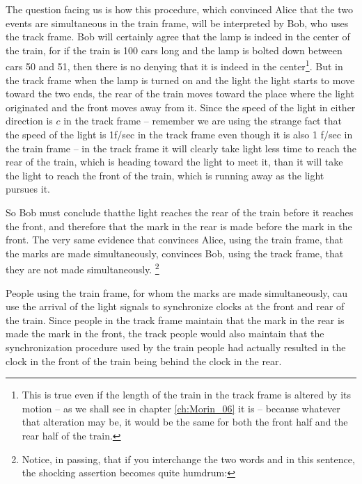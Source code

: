 The question facing us is how this procedure, which convinced Alice that the two events are simultaneous in the train frame, will be interpreted by Bob, who uses the track frame. Bob will certainly agree that the lamp is indeed in the center of the train, for if the train is 100 cars long and the lamp is bolted down between cars 50 and 51, then there is no denying that it is indeed in the center\footnote{This is true even if the length of the train in the track frame is altered by its motion -- as we shall see in chapter \ref{ch:Morin_06} it is -- because whatever that alteration may be, it would be the same for both the front half and the rear half of the train.}. But in the track frame when the lamp is turned on and the light the light starts to move toward the two ends, the rear of the train moves toward the place where the light originated and the front moves away from it. Since the speed of the light in either direction is $c$ in the track frame -- remember we are using the strange fact that the speed of the light is 1f/sec in the track frame even though it is also 1 f/sec in the train frame -- in the track frame it will clearly take light less time to reach the rear of the train, which is heading toward the light to meet it, than it will take the light to reach the front of the train, which is running away as the light pursues it.

So Bob must conclude thatthe light reaches the rear of the train before it reaches the front, and therefore that the mark in the rear is made before the mark in the front. The very same evidence that convinces Alice, using the train frame, that the marks are made simultaneously, convinces Bob, using the track frame, that they are not made simultaneously.  \footnote{Notice, in passing, that if you interchange the two words  and  in this sentence, the shocking assertion becomes quite humdrum: }

People using the train frame, for whom the marks are made simultaneously, cau use the arrival of the light signals to synchronize clocks at the front and rear of the train. Since people in the track frame maintain that the mark in the rear is made  the mark in the front, the track people would also maintain that the synchronization procedure used by the train people had actually resulted in the clock in the front of the train being behind the clock in the rear. 

